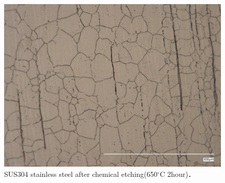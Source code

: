 \begin{figure}[htbp]
    \centering %
    \includegraphics[width=100truemm,clip]{fig/241218_304650C2h_etching.jpg}
    \caption{SUS304 stainless steel after chemical etching(650$^\circ$C 2hour)．}
    \label{fig:304650Etching}
\end{figure}

